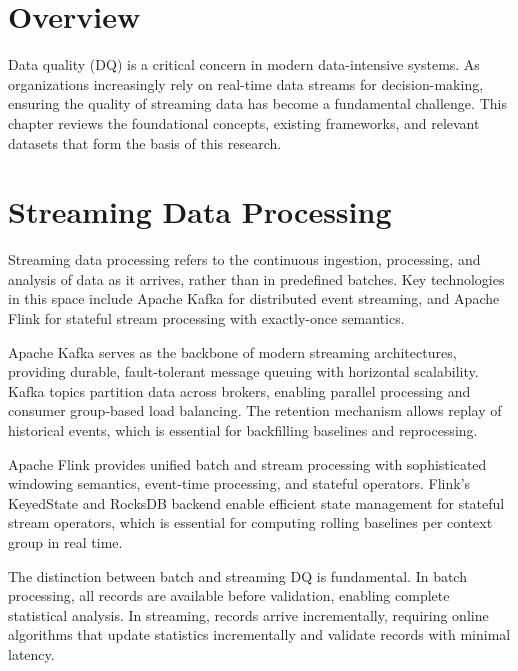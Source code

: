 \pagestyle{fancy}

\section{Overview}

Data quality (DQ) is a critical concern in modern data-intensive systems. As organizations increasingly rely on real-time data streams for decision-making, ensuring the quality of streaming data has become a fundamental challenge. This chapter reviews the foundational concepts, existing frameworks, and relevant datasets that form the basis of this research.

\section{Streaming Data Processing}

Streaming data processing refers to the continuous ingestion, processing, and analysis of data as it arrives, rather than in predefined batches. Key technologies in this space include Apache Kafka \citep{kafkaintro2024} for distributed event streaming, and Apache Flink \citep{flinkdocs2024} for stateful stream processing with exactly-once semantics.

Apache Kafka serves as the backbone of modern streaming architectures, providing durable, fault-tolerant message queuing with horizontal scalability. Kafka topics partition data across brokers, enabling parallel processing and consumer group-based load balancing. The retention mechanism allows replay of historical events, which is essential for backfilling baselines and reprocessing.

Apache Flink provides unified batch and stream processing with sophisticated windowing semantics, event-time processing, and stateful operators. Flink's KeyedState and RocksDB backend enable efficient state management for stateful stream operators, which is essential for computing rolling baselines per context group in real time.

The distinction between batch and streaming DQ is fundamental. In batch processing, all records are available before validation, enabling complete statistical analysis. In streaming, records arrive incrementally, requiring online algorithms that update statistics incrementally and validate records with minimal latency.

